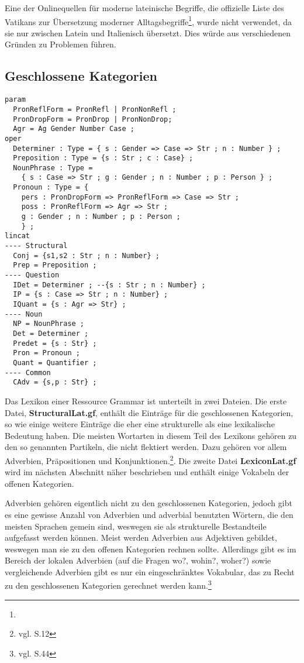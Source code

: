 Eine der Onlinequellen für moderne lateinische Begriffe, die offizielle Liste des Vatikans zur Übersetzung moderner Alltagsbegriffe\footnote{\vatlatinitas}, wurde nicht verwendet, da sie nur zwischen Latein und Italienisch übersetzt. Dies würde aus verschiedenen Gründen zu Problemen führen.
\subsection{Geschlossene Kategorien}
\label{subsec:geschlossene}
\begin{lstlisting}[float=h!tp,caption={Für \textbf{StructuralLat.gf} nötige \texttt{lincat}-Definitionen für geschlossene Kategorien},label={GF-Structural-Lincat},basicstyle=\small]
param
  PronReflForm = PronRefl | PronNonRefl ;
  PronDropForm = PronDrop | PronNonDrop;
  Agr = Ag Gender Number Case ;
oper
  Determiner : Type = { s : Gender => Case => Str ; n : Number } ;
  Preposition : Type = {s : Str ; c : Case} ;
  NounPhrase : Type = 
    { s : Case => Str ; g : Gender ; n : Number ; p : Person } ;
  Pronoun : Type = {
    pers : PronDropForm => PronReflForm => Case => Str ;
    poss : PronReflForm => Agr => Str ;
    g : Gender ; n : Number ; p : Person ;
    } ;
lincat
---- Structural
  Conj = {s1,s2 : Str ; n : Number} ;
  Prep = Preposition ;
---- Question
  IDet = Determiner ; --{s : Str ; n : Number} ;
  IP = {s : Case => Str ; n : Number} ;
  IQuant = {s : Agr => Str} ;
---- Noun
  NP = NounPhrase ;
  Det = Determiner ;
  Predet = {s : Str} ;
  Pron = Pronoun ;
  Quant = Quantifier ;
---- Common
  CAdv = {s,p : Str} ; 
\end{lstlisting}
Das Lexikon einer Ressource Grammar ist unterteilt in zwei Dateien. Die erste Datei, \textbf{StructuralLat.gf}, enthält die Einträge für die geschlossenen Kategorien, so wie einige weitere Einträge die eher eine strukturelle als eine lexikalische Bedeutung haben. Die meisten Wortarten in diesem Teil des Lexikons gehören zu den so genannten Partikeln, die nicht flektiert werden. Dazu gehören vor allem Adverbien, Präpositionen und Konjunktionen.\footnote{vgl. \cite{BAYER-LINDAUER1994} S.12}. Die zweite Datei \textbf{LexiconLat.gf} wird im nächsten Abschnitt näher beschrieben und enthält einige Vokabeln der offenen Kategorien. \par
Adverbien gehören eigentlich nicht zu den geschlossenen Kategorien, jedoch gibt es eine gewisse Anzahl von Adverbien und adverbial benutzten Wörtern, die den meisten Sprachen gemein sind, weswegen sie als strukturelle Bestandteile aufgefasst werden können. Meist werden Adverbien aus Adjektiven gebildet, weswegen man sie zu den offenen Kategorien rechnen sollte. Allerdings gibt es im  Bereich der lokalen Adverbien (auf die Fragen wo?, wohin?, woher?) sowie vergleichende Adverbien gibt es nur ein eingeschränktes Vokabular, das zu Recht zu den geschlossenen Kategorien gerechnet werden kann.\footnote{vgl. \cite{BAYER-LINDAUER1994} S.44} 
